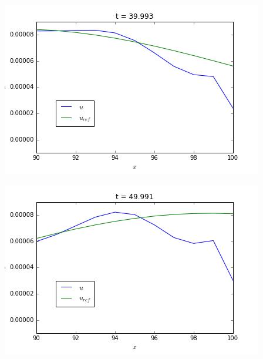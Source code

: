 \indent

\begingroup
	\noindent
	\begin{minipage}{.45\linewidth}
		\includegraphics[scale=.5]{figures/robin1A.png}	
	\end{minipage}
	\hfill
	\begin{minipage}{.45\linewidth}
		\includegraphics[scale=.5]{figures/robin1B.png}	
	\end{minipage}
\endgroup

\indent

\indent

